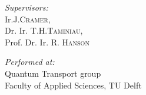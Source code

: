 \documentclass[a4paper,10pt]{report}
\begin{document}
\begin{minipage}{0.5\textwidth}
\begin{flushleft} \large
\emph{Supervisors:}\\
Ir.J.\textsc{Cramer}, \\
Dr. Ir. T.H.\textsc{Taminiau}, \\
Prof. Dr. Ir. R. \textsc{Hanson}
\end{flushleft}
\end{minipage}
\begin{minipage}{0.5\textwidth}
\begin{flushright} \large
\emph{Performed at:} \\
Quantum Transport group \\
Faculty of Applied Sciences, TU Delft
\end{flushright}
\end{minipage}





\normalsize

\newpage
\end{document}
